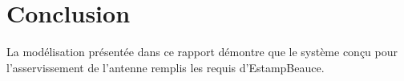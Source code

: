 \documentclass{udes_rapport} %
\begin{document}
\section{Conclusion}

La modélisation présentée dans ce rapport démontre que le système conçu pour
 l'asservissement de l'antenne remplis les requis d'EstampBeauce.








\begin{comment}
\begin{center}
	\centering
	\texttt{[image: puissance]}
	\captionof{figure}{Spectre de puissance d'une onde de 1kHz}
	\label{puissance}
\end{center}


\section{Filtres FIR}
\noindent\begin{minipage}{\textwidth} 
\begin{minipage}{0.5\textwidth}
  \centering
  \texttt{[image: ampFIR]}
  \captionof{subfigure}{Amplitude}
  \label{FIR:ampFIR}
\end{minipage}%
\begin{minipage}{0.5\textwidth}
  \centering 
  \texttt{[image: phaseCute]} 
  \captionof{subfigure}{Phase} 
  \label{FIR:phaseFIR} 
\end{minipage} 
\captionof{figure}{Filtre IIR} 
\label{FIR} 
\end{minipage}
\end{comment}
\end{document}
